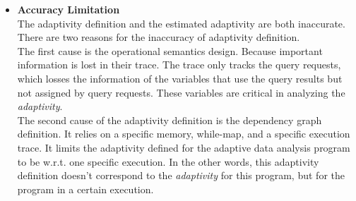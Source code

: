{\begin{itemize}
\begin{enumerate}
 This is caused by their \textbf{ag-loop} rule in Figure~\ref{fig:prework-static_alg1}.
 This rule unfolds every iteration of the while loop, and creates new annotated variables for every iteration.
 In order to guarantee the termination of the analysis, they have to limit the loop with the constant number of loop iterations.
 Specifically in rule \textbf{ag-loop} and \textbf{ad-loop},
 the premise in these two rules requires
 the arithmetic expression
 to be a natural number. 
 This rule limits the program cannot even
 have a loop with an arithmetic expression like $10 + 4$ in the guard.
    \end{enumerate}
 \item \textbf{Accuracy Limitation}
 \\
 The adaptivity definition and the estimated adaptivity are both inaccurate.
 \\
 There are two reasons for the inaccuracy of adaptivity definition.
 \\
 The first cause is the operational semantics design.
 Because important information is lost in their trace.
 The trace only tracks the query requests, which losses the information of the variables
 that use the query results but not assigned by query requests.
These variables
 are critical in analyzing the \emph{adaptivity}.
 \\
 The second cause of the adaptivity definition is the dependency graph definition.
 It relies on a specific memory, while-map, and a specific execution trace.
 It limits the adaptivity defined for the adaptive data analysis program to be w.r.t. one specific
 execution.
 In the other words, this adaptivity definition doesn't correspond to the \emph{adaptivity} for this program,
 but for the program in a certain execution.

\end{itemize}}
